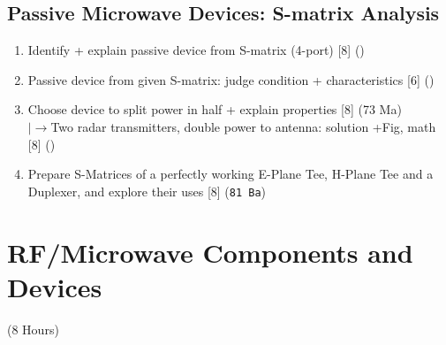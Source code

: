\documentclass[12pt]{article}
\newcommand{\lb}{\\$\left|\rightarrow\right.$}
\begin{document}
  \subsection{Passive Microwave Devices: S-matrix Analysis}
    \begin{enumerate}[topsep=0pt, noitemsep]
      \item Identify + explain passive device from S-matrix (4-port) \hfill [8] ()
      \item Passive device from given S-matrix: judge condition + characteristics \hfill [6] ()
      \item Choose device to split power in half + explain properties \hfill [8] (73 Ma)
        \lb Two radar transmitters, double power to antenna: solution +Fig, math \hfill [8] ()
      \item Prepare S-Matrices of a perfectly working E-Plane Tee, H-Plane Tee and a Duplexer, and explore their uses \hfill [8] (\texttt{81 Ba})
    \end{enumerate}

\pagebreak
\section{RF/Microwave Components and Devices}
\begin{center}(8 Hours)\end{center}
\end{document}

